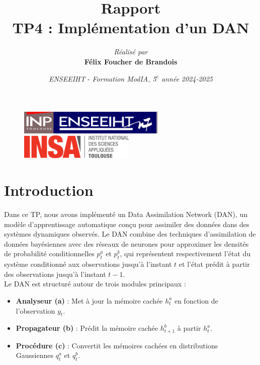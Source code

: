 \documentclass[12pt,a4paper]{article}
\title{\vspace{4cm}
        Rapport \\
        \vspace{1cm} \textbf{TP4 : Implémentation d'un DAN} \\ 
        \vspace{4cm} 
}
\author{\textit{Réalisé par} \vspace{0.5cm}\\
        \textbf{Félix Foucher de Brandois}
}
\date{\vfill
        \textit{ENSEEIHT} - 
        \textit{Formation ModIA, 5$^{e}$ année}
        \hfill
        \textit{2024-2025} \\
        \vspace{1cm}
}
\begin{document}
\begin{figure}[t]
    \centering
    \includegraphics[width=7cm]{src/inp_n7.png}
    \hfill
    \includegraphics[width=5.5cm]{src/insa_toulouse.png}
\end{figure}


\maketitle
\thispagestyle{empty}

\newpage

\section{Introduction}
Dans ce TP, nous avons implémenté un Data Assimilation Network (DAN), un modèle d'apprentissage automatique conçu pour assimiler des données dans des systèmes dynamiques observés.
Le DAN combine des techniques d'assimilation de données bayésiennes avec des réseaux de neurones pour approximer les densités de probabilité conditionnelles $p^a_t$ et $p^b_t$, qui représentent respectivement l'état du système conditionné aux observations jusqu'à l'instant $t$ et l'état prédit à partir des observations jusqu'à l'instant $t-1$. \\

Le DAN est structuré autour de trois modules principaux :
\begin{itemize}
    \item \textbf{Analyseur (a)} : Met à jour la mémoire cachée $h^a_t$ en fonction de l'observation $y_t$.
    \item \textbf{Propagateur (b)} : Prédit la mémoire cachée $h^b_{t+1}$ à partir $h^a_t$.
    \item \textbf{Procédure (c)} : Convertit les mémoires cachées en distributions Gaussiennes $q^a_t$ et $q^b_t$.
\end{itemize}
\end{document}
